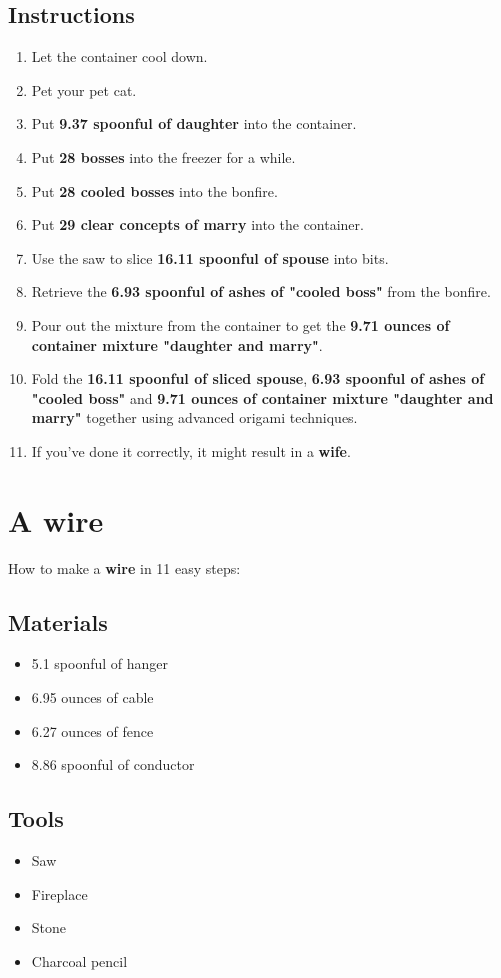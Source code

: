 \documentclass{article}
\begin{document}
\subsection{Instructions}\begin{enumerate}
\item 
Let the container cool down.
\item 
Pet your pet cat.
\item 
Put \textbf{9.37 spoonful of daughter} into the container.
\item 
Put \textbf{28 bosses} into the freezer for a while.
\item 
Put \textbf{28 cooled bosses} into the bonfire.
\item 
Put \textbf{29 clear concepts of marry} into the container.
\item 
Use the saw to slice \textbf{16.11 spoonful of spouse} into bits.
\item 
Retrieve the \textbf{6.93 spoonful of ashes of "cooled boss"} from the bonfire.
\item 
Pour out the mixture from the container to get the \textbf{9.71 ounces of container mixture "daughter and marry"}.
\item 
Fold the \textbf{16.11 spoonful of sliced spouse}, \textbf{6.93 spoonful of ashes of "cooled boss"} and \textbf{9.71 ounces of container mixture "daughter and marry"} together using advanced origami techniques.
\item 
If you've done it correctly, it might result in a \textbf{wife}.
\end{enumerate}
\newpage
\section{A wire}How to make a \textbf{wire} in 11 easy steps:

\subsection{Materials}\begin{itemize}
\item 
5.1 spoonful of hanger
\item 
6.95 ounces of cable
\item 
6.27 ounces of fence
\item 
8.86 spoonful of conductor
\end{itemize}
\subsection{Tools}\begin{itemize}
\item 
Saw
\item 
Fireplace
\item 
Stone
\item 
Charcoal pencil
\end{itemize}
\end{document}
